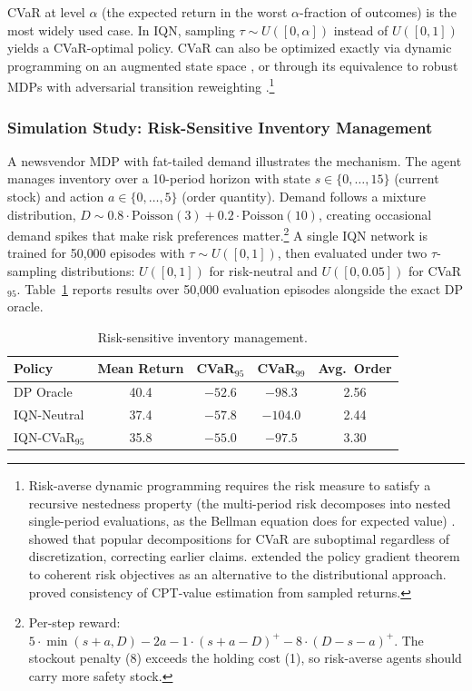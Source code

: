 CVaR at level $\alpha$ (the expected return in the worst $\alpha$-fraction
of outcomes) is the most widely used case. In IQN, sampling
$\tau \sim U([0, \alpha])$ instead of $U([0,1])$ yields a CVaR-optimal
policy. CVaR can also be optimized exactly via dynamic programming on an
augmented state space \citep{Bauerle2011}, or through its equivalence to
robust MDPs with adversarial transition reweighting
\citep{Chow2015}.\footnote{Risk-averse dynamic programming requires the
risk measure to satisfy a recursive nestedness property (the
multi-period risk decomposes into nested single-period evaluations, as
the Bellman equation does for expected value)
\citep{Ruszczynski2010}. \citet{Hau2023} showed that popular decompositions
for CVaR are suboptimal regardless of discretization, correcting earlier
claims. \citet{Tamar2015} extended the policy gradient theorem to coherent
risk objectives as an alternative to the distributional approach.
\citet{Prashanth2016} proved consistency of CPT-value estimation from
sampled returns.}


\subsubsection{Simulation Study: Risk-Sensitive Inventory Management}
\label{subsec:sim_risk_inventory}

A newsvendor MDP with fat-tailed demand illustrates the mechanism.
The agent manages inventory over a 10-period horizon with state
$s \in \{0, \ldots, 15\}$ (current stock) and action $a \in \{0, \ldots, 5\}$
(order quantity). Demand follows a mixture distribution,
$D \sim 0.8 \cdot \text{Poisson}(3) + 0.2 \cdot \text{Poisson}(10)$,
creating occasional demand spikes that make risk preferences
matter.\footnote{Per-step reward:
$5 \cdot \min(s+a, D) - 2a - 1 \cdot (s+a-D)^+ - 8 \cdot (D-s-a)^+$.
The stockout penalty (8) exceeds the holding cost (1), so risk-averse
agents should carry more safety stock.}
A single IQN network is trained for 50{,}000 episodes with
$\tau \sim U([0,1])$, then evaluated under two $\tau$-sampling
distributions: $U([0,1])$ for risk-neutral and $U([0, 0.05])$ for
CVaR$_{95}$. Table~\ref{tab:risk_inventory} reports results over
50{,}000 evaluation episodes alongside the exact DP oracle.

\begin{table}[h]
\centering
\caption{Risk-sensitive inventory management.}
\label{tab:risk_inventory}
\begin{tabular}{lcccc}
\hline
Policy & Mean Return & CVaR$_{95}$ & CVaR$_{99}$ & Avg.\ Order \\
\hline
DP Oracle & 40.4 & $-52.6$ & $-98.3$ & 2.56 \\
IQN-Neutral & 37.4 & $-57.8$ & $-104.0$ & 2.44 \\
IQN-CVaR$_{95}$ & 35.8 & $-55.0$ & $-97.5$ & 3.30 \\
\hline
\end{tabular}
\end{table}

